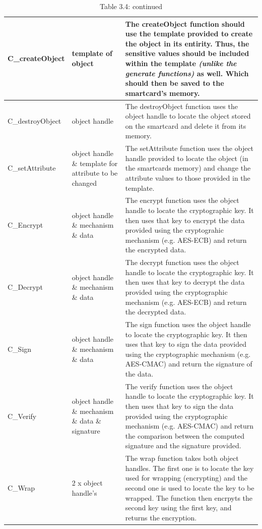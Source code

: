 \documentclass[bsc,frontabs,twoside,singlespacing,parskip,deptreport]{infthesis}     %
\begin{document}
\begin{table}[H]
\hskip-1.5cm\begin{tabular}{|l|p{5cm}|p{8cm}|}
\hline
C\_createObject & template of object & The createObject function should use the template provided to create the object in its entirity. Thus, the sensitive values should be included within the template \textit{(unlike the generate functions)} as well. Which should then be saved to the smartcard's memory.\\
\hline
C\_destroyObject & object handle & The destroyObject function uses the object handle to locate the object stored on the smartcard and delete it from its memory. \\
\hline 
C\_setAttribute & object handle \& template for attribute to be changed & The setAttribute function uses the object handle provided to locate the object (in the smartcards memory) and change the attribute values to those provided in the template. \\
\hline
C\_Encrypt & object handle \& mechanism \& data & The encrypt function uses the object handle to locate the cryptographic key. It then uses that key to encrypt the data provided using the cryptograhic mechanism (e.g. AES-ECB) and return the encrypted data. \\
\hline
C\_Decrypt & object handle \& mechanism \& data & The decrypt function uses the object handle to locate the cryptographic key. It then uses that key to decrypt the data provided using the cryptographic mechanism (e.g. AES-ECB) and return the decrypted data. \\
\hline
C\_Sign & object handle \& mechanism \& data & The sign function uses the object handle to locate the cryptographic key. It then uses that key to sign the data provided using the cryptographic mechanism (e.g. AES-CMAC) and return the signature of the data. \\
\hline
C\_Verify & object handle \& mechanism \& data \& signature & The verify function uses the object handle to locate the cryptographic key. It then uses that key to sign the data provided using the cryptographic mechanism (e.g. AES-CMAC) and return the comparison between the computed signature and the signature provided. \\
\hline
C\_Wrap & 2 x object handle's &  The wrap function takes both object handles. The first one is to locate the key used for wrapping (encrypting) and the second one is used to locate the key to be wrapped. The function then encrpyts the second key using the first key, and returns the encryption. \\
\hline
\end{tabular}
\caption*{Table 3.4: continued}
\end{table}
\end{document}

